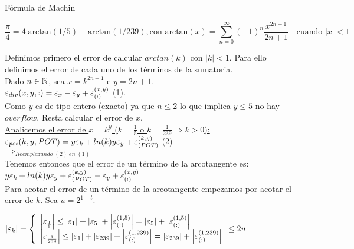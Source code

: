 \begin{subsection}{Fórmula de Machin}

	\begin{equation*}
		\frac{\pi}{4} = 4 \; \mathrm{arctan}(1/5) - \mathrm{arctan}(1/239), \text{con } \mathrm{arctan}(x) = \sum_{n=0}^{\infty} \left(-1\right)^n \frac{x^{2n+1}}{2n+1} \quad \text{cuando } \left|x\right|<1
    \end{equation*}
	
	\pa
	
	Definimos primero el error de calcular $arctan(k)$ con $|k|<1$. Para ello definimos el error de cada uno de los términos de la sumatoria.\\
	
	Dado $n \in \mathbb{N}$, sea $x=k^{2n+1}$ e $y=2n+1$.\\
	
	$\varepsilon _{div}({x,y,:}) = \varepsilon _{x} - \varepsilon _{y} + \varepsilon _{({:})}^{({x,y})}$ (1).\\
	
	Como $y$ es de tipo entero (exacto) ya que $n \leq 2$ lo que implica $y \leq 5$ no hay $overflow$. Resta calcular el error de $x$.\\
	
	\underline{Analicemos el error de $x=k^y$ ($k=\frac{1}{5}$ o $k=\frac{1}{239} \Rightarrow k>0$):}\\
	
	$\varepsilon _{pot}({k,y,POT}) = y\varepsilon _{k} + ln(k) y\varepsilon _{y} + \varepsilon _{({POT})}^{({k,y})}$ (2)\\
	
	$\Rightarrow_{Reemplazando \; (2) \; en \; (1)}$\\
	
	Tenemos entonces que el error de un término de la arcotangente es:\\
	
	$y\varepsilon _{k} + ln(k) y\varepsilon _{y} + \varepsilon _{({POT})}^{({k,y})} - \varepsilon _{y} + \varepsilon _{({:})}^{({x,y})}$\\
	
	Para acotar el error de un término de la arcotangente empezamos por acotar el error de $k$.
	Sea $u=2^{1-t}$.\\
	
	\pa
	
	$\left|\varepsilon _{k}\right| = \left\{ 
	\begin{array}{l}
	\left|\varepsilon _{\frac{1}{5}}\right| \leq \left|\varepsilon _{1}\right| + \left|\varepsilon _{5}\right| + \left|\varepsilon _{({:})}^{({1,5})}\right| = \left|\varepsilon _{5}\right| + \left|\varepsilon _{({:})}^{({1,5})}\right|\\
	\left|\varepsilon _{\frac{1}{239}}\right| \leq \left|\varepsilon _{1}\right| + \left|\varepsilon _{239}\right| + \left|\varepsilon _{({:})}^{({1,239})}\right| = \left|\varepsilon _{239}\right| + \left|\varepsilon _{({:})}^{({1,239})}\right|\\
	\end{array}
	\leq 2u\\
	\right.$\\
	

\end{subsection}
